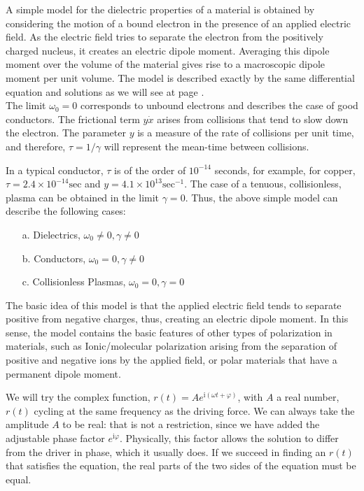 	\begin{tcolorbox}[title=Remark,colframe=black,arc=10pt]
	\label{dielectric model}A simple model for the dielectric properties of a material is obtained by considering the motion of a bound electron in the presence of an applied electric field. As the electric field tries to separate the electron from the positively charged nucleus, it creates an electric dipole moment. Averaging this dipole moment over the volume of the material gives rise to a macroscopic dipole moment per unit volume. The model is described exactly by the same differential equation and solutions as we will see at page \pageref{simple model of dielectric conductors and plasmas}.\\
	
	The limit $\omega_{0}=0$ corresponds to unbound electrons and describes the case of good conductors. The frictional term $y \dot{x}$ arises from collisions that tend to slow down the electron. The parameter $y$ is a measure of the rate of collisions per unit time, and therefore, $\tau=1 / \gamma$ will represent the mean-time between collisions.

	In a typical conductor, $\tau$ is of the order of $10^{-14}$ seconds, for example, for copper, $\tau=2.4 \times 10^{-14} \mathrm{sec}$ and $y=4.1 \times 10^{13} \mathrm{sec}^{-1} .$ The case of a tenuous, collisionless, plasma can be obtained in the limit $\gamma=0 .$ Thus, the above simple model can describe the following cases:
	\begin{itemize}
		\item[a.] Dielectrics, $\omega_{0} \neq 0, \gamma \neq 0$
		\item[b.] Conductors, $\omega_{0}=0, \gamma \neq 0$
		\item[c.] Collisionless Plasmas, $\omega_{0}=0, \gamma=0$
	\end{itemize}
	The basic idea of this model is that the applied electric field tends to separate positive from negative charges, thus, creating an electric dipole moment. In this sense, the model contains the basic features of other types of polarization in materials, such as Ionic/molecular polarization arising from the separation of positive and negative ions by the applied field, or polar materials that have a permanent dipole moment.
	\end{tcolorbox}

	We will try the complex function,  $r(t)=Ae^{\mathrm{i}(\omega t+\varphi)}$, with  $A$  a real number,  $r(t)$ cycling at the same frequency as the driving force.  We can always take the amplitude $A$  to be real: that is not a restriction, since we have added the adjustable phase factor $e^{\mathrm{i}\varphi}$.   Physically, this factor allows the solution to differ from the driver in phase, which it usually does.  If we succeed in finding an $r(t)$  that satisfies the equation, the real parts of the two sides of the equation must be equal.
	
